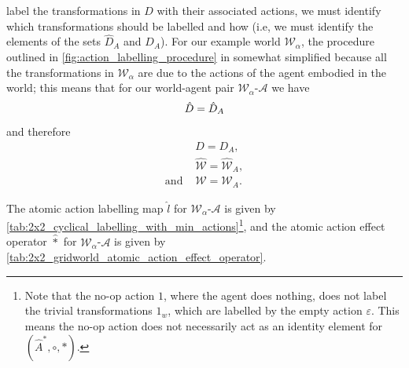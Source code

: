  label the transformations in $D$ with their associated actions, we must identify which transformations should be labelled and how (i.e, we must identify the elements of the sets $\hat{D}_{A}$ and $D_{A}$).
For our example world $\mathscr{W}_{\alpha}$, the procedure outlined in \cref{fig:action_labelling_procedure} in somewhat simplified because all the transformations in $\mathscr{W}_{\alpha}$ are due to the actions of the agent embodied in the world; this means that for our world-agent pair $\mathscr{W}_{\alpha}$-$\mathscr{A}$ we have
\begin{equation}
    \hat{D} = \hat{D}_{A} \\
\end{equation}
and therefore
\begin{align}
    & D = D_{A}, \\
    & \hat{\mathscr{W}} = \hat{\mathscr{W}}_{A}, \\
    \text{and } & \mathscr{W} = \mathscr{W}_{A}.
\end{align}

The atomic action labelling map $\hat{l}$ for $\mathscr{W}_{\alpha}$-$\mathscr{A}$ is given by \cref{tab:2x2_cyclical_labelling_with_min_actions}\footnote{
    Note that the no-op action $1$, where the agent does nothing, does not label the trivial transformations $1_{w}$, which are labelled by the empty action $\varepsilon$.
    This means the no-op action does not necessarily act as an identity element for $(\hat{A}^{*}, \circ, \ast)$.
}, and the atomic action effect operator $\hat{\ast}$ for $\mathscr{W}_{\alpha}$-$\mathscr{A}$ is given by \cref{tab:2x2_gridworld_atomic_action_effect_operator}.

